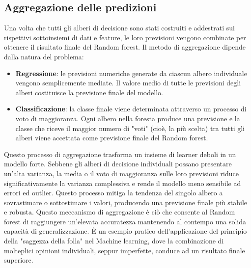 \documentclass[a4paper,12pt]{report}
\begin{document}
	\subsection{Aggregazione delle predizioni}
	
	Una volta che tutti gli alberi di decisione sono stati costruiti e addestrati sui rispettivi sottoinsiemi di dati e feature, le loro previsioni vengono combinate per ottenere il risultato finale del Random forest. Il metodo di aggregazione dipende dalla natura del problema:
	\begin{itemize}
		\item \textbf{Regressione}: le previsioni numeriche generate da ciascun albero individuale vengono semplicemente mediate. Il valore medio di tutte le previsioni degli alberi costituisce la previsione finale del modello.
		\item \textbf{Classificazione}: la classe finale viene determinata attraverso un processo di voto di maggioranza. Ogni albero nella foresta produce una previsione e la classe che riceve il maggior numero di "voti" (cioè, la più scelta) tra tutti gli alberi viene accettata come previsione finale del Random forest.
	\end{itemize}
	
	Questo processo di aggregazione trasforma un insieme di learner deboli in un modello forte. Sebbene gli alberi di decisione individuali possano presentare un'alta varianza, la media o il voto di maggioranza sulle loro previsioni riduce significativamente la varianza complessiva e rende il modello meno sensibile ad errori ed outlier. Questo processo mitiga la tendenza del singolo albero a sovrastimare o sottostimare i valori, producendo una previsione finale più stabile e robusta. Questo meccanismo di aggregazione è ciò che consente al Random forest di raggiungere un'elevata accuratezza mantenendo al contempo una solida capacità di generalizzazione. È un esempio pratico dell'applicazione del principio della "saggezza della folla" nel Machine learning, dove la combinazione di molteplici opinioni individuali, seppur imperfette, conduce ad un risultato finale superiore.
	
\end{document}
